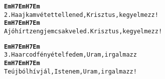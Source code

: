 \begin{minipage}{\textwidth}
\kottastart
{}
\kottaend
\begin{minipage}{\textwidth}
\begin{alltt}
\textbf{      Em     H7    Em        H7              Em}
2. Ha ajkam vétett ellened, Krisztus, kegyelmezz!
\textbf{      Em      H7      Em           H7             Em}
   A jó hírt zengjem csak veled. Krisztus, kegyelmezz!
\end{alltt}
\vspace{0.0cm}
\versszakspacing
\end{minipage}
\begin{minipage}{\textwidth}
\begin{alltt}
\textbf{      Em     H7    Em       H7          Em}
3. Ha arcod fényét elfedem, Uram, irgalmazz
\textbf{   Em        H7     Em       H7          Em}
   Te újból hívjál, Istenem, Uram, irgalmazz!
\end{alltt}
\vspace{0.0cm}
\versszakspacing
\end{minipage}
\end{minipage}
~\vspace{1.0cm}
\newline
